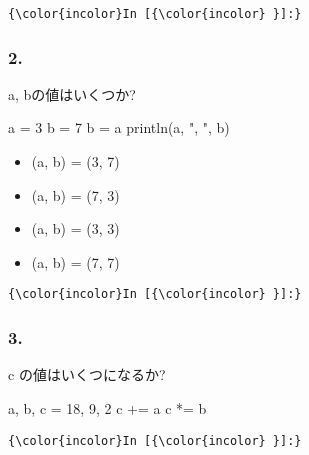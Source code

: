\documentclass[a4paper,dvipdfmx,uplatex]{jsarticle}
\providecommand{\tightlist}{%
      \setlength{\itemsep}{0pt}\setlength{\parskip}{0pt}}
\newenvironment{Shaded}{}{}
\newcommand{\FloatTok}[1]{\textcolor[rgb]{0.25,0.63,0.44}{{#1}}}
\newcommand{\StringTok}[1]{\textcolor[rgb]{0.25,0.44,0.63}{{#1}}}
\newcommand{\NormalTok}[1]{{#1}}
\begin{document}
    \begin{Verbatim}[commandchars=\\\{\}]
{\color{incolor}In [{\color{incolor} }]:} 
\end{Verbatim}

    \subsubsection{2.}\label{section}

a, bの値はいくつか?

\begin{Shaded}
\begin{Highlighting}[]
\NormalTok{a = }\FloatTok{3}
\NormalTok{b = }\FloatTok{7}
\NormalTok{b = a}
\NormalTok{println(a, }\StringTok{", "}\NormalTok{, b)}
\end{Highlighting}
\end{Shaded}

\begin{itemize}
\tightlist
\item
  (a, b) = (3, 7)
\item
  (a, b) = (7, 3)
\item
  (a, b) = (3, 3)
\item
  (a, b) = (7, 7)
\end{itemize}

    \begin{Verbatim}[commandchars=\\\{\}]
{\color{incolor}In [{\color{incolor} }]:} 
\end{Verbatim}

    \subsubsection{3.}\label{section}

c の値はいくつになるか?

\begin{Shaded}
\begin{Highlighting}[]
\NormalTok{a, b, c = }\FloatTok{18}\NormalTok{, }\FloatTok{9}\NormalTok{, }\FloatTok{2}
\NormalTok{c += a}
\NormalTok{c *= b}
\end{Highlighting}
\end{Shaded}

    \begin{Verbatim}[commandchars=\\\{\}]
{\color{incolor}In [{\color{incolor} }]:} 
\end{Verbatim}
\end{document}
